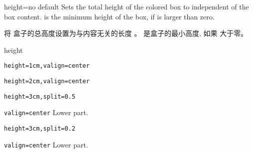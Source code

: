 
\begin{docTcbKey}{height}{=}{no default}
Sets the total height of the colored box to  independent
of the box content.  is the minimum height of the box, if
 is larger than zero.

将%
盒子的总高度设置为与内容无关的长度  。  是盒子的最小高度, 如果
 大于零。
\begin{exdispExample}{height}

\begin{tcolorbox}[height=1cm,valign=center]
\verb|height=1cm,valign=center|
\end{tcolorbox}
\begin{tcolorbox}[height=2cm,valign=center]
\verb|height=2cm,valign=center|
\end{tcolorbox}

\begin{tcolorbox}[height=3cm,split=0.5,valign=center]
\verb|height=3cm,split=0.5|

\verb|valign=center|
\tcblower
Lower part.
\end{tcolorbox}
\begin{tcolorbox}[height=3cm,split=0.2,valign=center]
\verb|height=3cm,split=0.2|

\verb|valign=center|
\tcblower
Lower part.
\end{tcolorbox}
\end{exdispExample}

\end{docTcbKey}